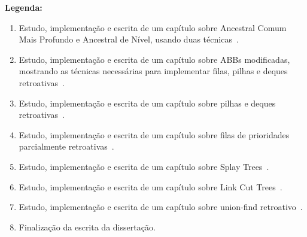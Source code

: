 \documentclass[quali.tex]{subfile}
\begin{document}
\noindent 
{\bf Legenda:}
\begin{enumerate}
\item Estudo, implementação e escrita de um capítulo sobre Ancestral Comum Mais Profundo e Ancestral de Nível, usando duas técnicas~\cite{BenderM-F2004, Myers83}. \label{it:lca}
\item Estudo, implementação e escrita de um capítulo sobre ABBs modificadas, mostrando as técnicas necessárias para implementar filas, pilhas e deques retroativas~\cite{CormenAugment}. \label{it:abb}
\item Estudo, implementação e escrita de um capítulo sobre pilhas e deques retroativas~\cite{DemaineIL2007}. \label{it:deq}
\item Estudo, implementação e escrita de um capítulo sobre filas de prioridades parcialmente retroativas~\cite{DemaineIL2007}. \label{it:pq}
\item Estudo, implementação e escrita de um capítulo sobre Splay Trees~\cite{SleatorT1985}. \label{it:spl}
\item Estudo, implementação e escrita de um capítulo sobre Link Cut Trees~\cite{SleatorT1981}. \label{it:link}
\item Estudo, implementação e escrita de um capítulo sobre union-find retroativo~\cite{DemaineIL2007}. \label{it:uf}

\item Finalização da escrita da dissertação. \label{it:tese}
\end{enumerate}
\end{document}
